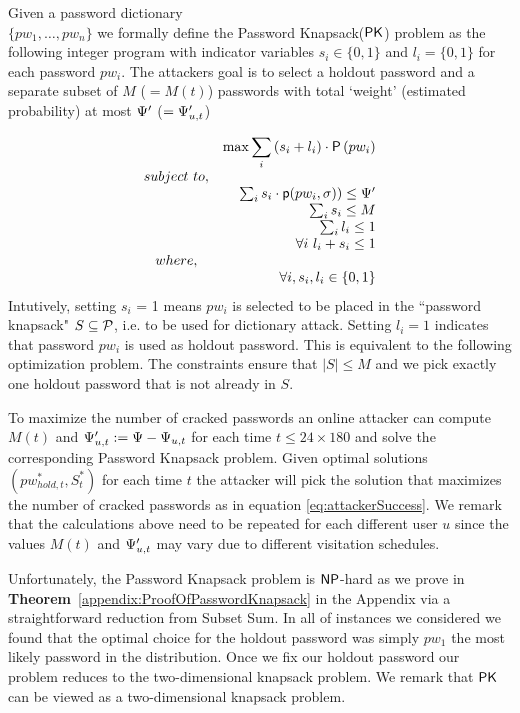   Given a password dictionary \\$\{pw_1, \ldots, pw_n\}$ we formally define the \textsf{P}assword \textsf{K}napsack($\mathsf{PK}$) problem as the following integer program with indicator variables $s_i \in \{0,1\}$ and $l_i=\{0,1\}$ for each password $pw_i$. The attackers goal is to select a holdout password and a separate subset of $M$ ($=M(t)$) passwords with total `weight' (estimated probability) at most $\Psi'$ ($= \Psi_{u,t}'$) 

$$
\begin{array}{crl}
	&\max {\displaystyle{\sum_i {(s_i + l_i) \cdot \ensuremath{\mathsf{P}\left(pw_{i}\right)}}}} \\
	subject\ to, &\\
	&\sum_i{s_i \cdot \textsf{p}(pw_i,\sigma)) \le \Psi'} \\
	&\sum_i s_i \le M\\
	&\sum_i l_i \le 1\\
	&\forall i~ l_i + s_i \le 1\\
	where,\\
	& \forall i, s_i, l_i \in \{0,1\}
\end{array}
$$
Intutively, setting $s_i$ = 1 means $pw_i$ is selected to be placed in the ``password knapsack" $S\subseteq \mathcal{P}$, i.e. to be used for dictionary attack. Setting $l_i=1$ indicates that password $pw_i$ is used as holdout password. This is equivalent to the following optimization problem. The constraints ensure that $|S| \leq M$ and we pick exactly one holdout password that is not already in $S$. 

 To maximize the number of cracked passwords an online attacker can compute $M(t)$ and $\Psi_{u,t}':=\Psi- \Psi_{u,t}$ for each time $t \leq 24 \times 180$ and solve the corresponding \textsf{P}assword \textsf{K}napsack problem. Given optimal solutions $(pw_{hold,t}^*, S_t^*)$ for each time $t$ the attacker will pick the solution that maximizes the number of cracked passwords as in equation \ref{eq:attackerSuccess}. We remark that the calculations above need to be repeated for each different user $u$ since the values $M(t)$ and $\Psi_{u,t}'$ may vary due to different visitation schedules.







  Unfortunately, the \textsf{P}assword \textsf{K}napsack problem is $\mathsf{NP}$-hard as we prove in \textbf{Theorem}~\ref{appendix:ProofOfPasswordKnapsack} in the Appendix via a straightforward reduction from Subset Sum. In all of instances we considered we found that the optimal choice for the holdout password was simply $pw_1$ the most likely password in the distribution. Once we fix our holdout password our problem reduces to the two-dimensional knapsack problem. We remark that $\mathsf{PK}$ can be viewed as a two-dimensional knapsack problem. 

